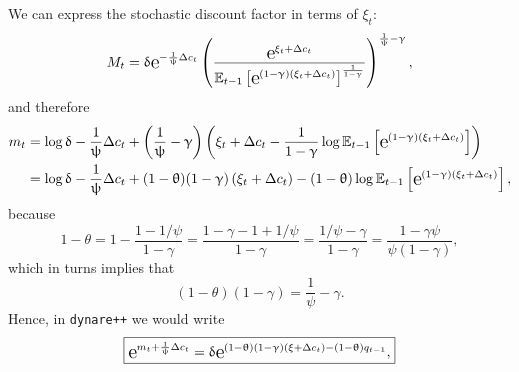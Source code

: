 	We can express the stochastic discount factor in terms of $\xi_t$:
\begin{equation}
M_t = \delta\e{-\frac{1}{\psi}\Delta c_t}\left(\frac{\e{\xi_t + \Delta c_t}}{\E_{t-1}\left[\e{(1-\gamma)(\xi_t + \Delta c_t)}\right]^{\frac{1}{1-\gamma}}}\right)^{\frac{1}{\psi}-\gamma},
\end{equation}
and therefore
$$
\begin{aligned}
	m_t &= \log\delta - \frac{1}{\psi}\Delta c_t + \left(\frac{1}{\psi}-\gamma\right)\left(\xi_t + \Delta c_t - \frac{1}{1-\gamma}\log\E_{t-1}\left[\e{(1-\gamma)(\xi_t + \Delta c_t)}\right]\right)\\
	&=  \log\delta - \frac{1}{\psi}\Delta c_t + (1-\theta)(1-\gamma)\left(\xi_t + \Delta c_t\right) - (1-\theta)\log\E_{t-1}\left[\e{(1-\gamma)(\xi_t + \Delta c_t)}\right],
\end{aligned}
$$
because
$$
1-\theta = 1-\frac{1-1/\psi}{1-\gamma} = \frac{1-\gamma - 1 + 1/\psi}{1-\gamma} = \frac{1/\psi - \gamma}{1-\gamma} = \frac{1-\gamma\psi}{\psi(1-\gamma)},
$$
which in turns implies that
$$
(1-\theta)(1-\gamma) = \frac{1}{\psi}-\gamma.
$$	
Hence, in \texttt{dynare++} we would write
\begin{equation}
	\boxed{\e{{m_t} + \frac{1}{\psi}\Delta c_t} = \delta \e{(1-\theta)(1-\gamma)(\xi + \Delta c_t) - (1-\theta)q_{t-1}},}
\end{equation}	


